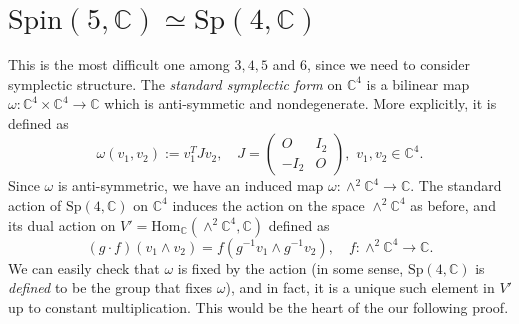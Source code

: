 \documentclass{article}
\newcommand{\Spin}{\mathrm{Spin}}
\newcommand{\Sp}{\mathrm{Sp}}
\newcommand{\Hom}{\mathrm{Hom}}
\begin{document}
\section{$\Spin(5, \mathbb{C})\simeq \Sp(4, \mathbb{C})$}
This is the most difficult one among $3, 4, 5$ and $6$, since we need to consider symplectic structure.
The \emph{standard symplectic form} on $\mathbb{C}^{4}$ is a bilinear map $\omega:\mathbb{C}^{4}\times \mathbb{C}^{4}\to \mathbb{C}$ which is anti-symmetic and nondegenerate. 
More explicitly, it is defined as
$$
\omega(v_{1}, v_{2}):= v_{1}^{T}Jv_{2}, \quad J = \begin{pmatrix} O & I_{2} \\ -I_{2} & O \end{pmatrix}, \,\, v_{1}, v_{2}\in \mathbb{C}^{4}.
$$
Since $\omega$ is anti-symmetric, we have an induced map $\omega:\wedge^{2}\mathbb{C}^{4}\to \mathbb{C}$. The standard action of $\Sp(4, \mathbb{C})$ on $\mathbb{C}^{4}$ induces the action on the space $\wedge^{2}\mathbb{C}^{4}$ as before, and its dual action on $V' = \Hom_{\mathbb{C}}(\wedge^{2}\mathbb{C}^{4}, \mathbb{C})$ defined as 
$$
(g\cdot f)(v_{1}\wedge v_{2}) = f(g^{-1}v_{1}\wedge g^{-1}v_{2}), \quad f:\wedge^{2}\mathbb{C}^{4}\to \mathbb{C}. 
$$
We can easily check that $\omega$ is fixed by the action (in some sense, $\Sp(4, \mathbb{C})$ is \emph{defined} to be the group that fixes $\omega$), and in fact, it is a unique such element in $V'$ up to constant multiplication. 
This would be the heart of the our following proof. 
\end{document}
